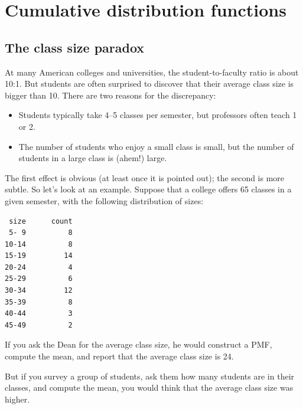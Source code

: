 \documentclass[12pt]{book}
\begin{document}
\chapter{Cumulative distribution functions}
\label{cumulative}

\section{The class size paradox}

At many American colleges and universities, the student-to-faculty
ratio is about 10:1.  But students are often surprised to discover
that their average class size is bigger than 10.  There
are two reasons for the discrepancy:

\begin{itemize}

\item Students typically take 4--5 classes per semester, but
professors often teach 1 or 2.

\item The number of students who enjoy a small class is small,
but the number of students in a large class is (ahem!) large.

\end{itemize}

The first effect is obvious (at least once it is pointed out);
the second is more subtle.  So let's look at an example.  Suppose
that a college offers 65 classes in a given semester, with the
following distribution of sizes:
%
\begin{verbatim}
 size      count
 5- 9          8
10-14          8
15-19         14
20-24          4
25-29          6
30-34         12
35-39          8
40-44          3
45-49          2
\end{verbatim}

If you ask the Dean for the average class size, he would
construct a PMF, compute the mean, and report that the
average class size is 24.

But if you survey a group of students, ask them how many
students are in their classes, and compute the mean, you would
think that the average class size was higher.
\end{document}
